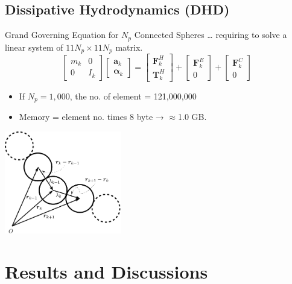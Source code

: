 \documentclass[t,presentation]{beamer}
\begin{document}
\subsection{Dissipative Hydrodynamics (DHD)}
\label{sec:org1133e0a}
\begin{frame}[label={sec:org869a0d6}]{Grand Governing Equation for \(N_p\) Connected Spheres}
\ldots{} requiring to solve a linear system of \(11N_{p}\times 11N_{p}\) matrix.
\begin{equation}
\left[\begin{array}{cc}
m_{k} & 0\\
0 & I_{k}
\end{array}\right]\left[\begin{array}{c}
\bm{a}_{k}\\
\bm{\alpha}_{k}
\end{array}\right]=\left[\begin{array}{c}
\bm{F}_{k}^{H}\\
\bm{T}_{k}^{H}
\end{array}\right]+\left[\begin{array}{c}
\bm{F}_{k}^{E}\\
0
\end{array}\right]+\left[\begin{array}{c}
\bm{F}_{k}^{C}\\
0
\end{array}\right]\label{eq:goveq}
\end{equation}
\begin{itemize}
\item If \(N_{p}= 1,000\), the no. of element = 121,000,000
\item Memory = element no. times 8 byte → \(\approx\)1.0 GB.
\end{itemize}
\begin{center}
\includegraphics[width=2.0in]{figures/fig-trimer-crop-1.png}
\label{orgec93873}
\end{center}
\end{frame}

\section{Results and Discussions}
\label{sec:orga751918}
\end{document}
